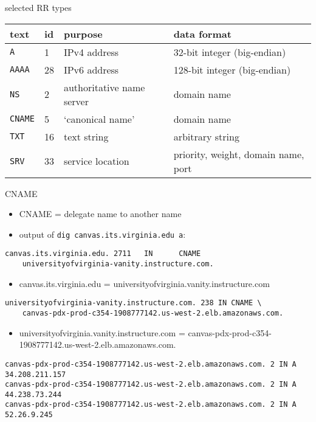 \begin{frame}{selected RR types}
\begin{tabular}{l|l|l|p{6cm}}
text & id & purpose & data format \\ \hline
\texttt{A} & 1 & IPv4 address & 32-bit integer (big-endian) \\
\texttt{AAAA} & 28 & IPv6 address & 128-bit integer (big-endian) \\
\texttt{NS} & 2 & authoritative name server & domain name \\
\texttt{CNAME} & 5 & `canonical name' & domain name \\
\texttt{TXT} & 16 & text string & arbitrary string \\
\texttt{SRV} & 33 & service location & priority, weight, domain name, port \\
\end{tabular}
\end{frame}

\begin{frame}[fragile]{CNAME}
\begin{itemize}
\item CNAME = delegate name to another name
\item output of \texttt{dig canvas.its.virginia.edu a}:
\end{itemize}
\begin{Verbatim}[fontsize=\fontsize{9}{10}]
canvas.its.virginia.edu. 2711   IN      CNAME
    universityofvirginia-vanity.instructure.com.
\end{Verbatim}
\begin{itemize}
\item canvas.its.virginia.edu = universityofvirginia.vanity.instructure.com
\end{itemize}
\begin{Verbatim}[fontsize=\fontsize{9}{10}]
universityofvirginia-vanity.instructure.com. 238 IN CNAME \
    canvas-pdx-prod-c354-1908777142.us-west-2.elb.amazonaws.com.
\end{Verbatim}
\begin{itemize}
\item universityofvirginia.vanity.instructure.com = canvas-pdx-prod-c354-1908777142.us-west-2.elb.amazonaws.com.
\end{itemize}
\begin{Verbatim}[fontsize=\fontsize{9}{10}]
canvas-pdx-prod-c354-1908777142.us-west-2.elb.amazonaws.com. 2 IN A 34.208.211.157
canvas-pdx-prod-c354-1908777142.us-west-2.elb.amazonaws.com. 2 IN A 44.238.73.244
canvas-pdx-prod-c354-1908777142.us-west-2.elb.amazonaws.com. 2 IN A 52.26.9.245
\end{Verbatim}
\end{frame}

